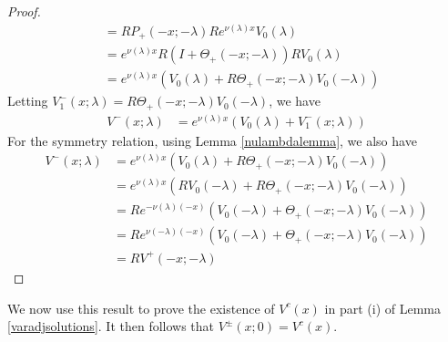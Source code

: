 \documentclass[thesis.tex]{subfiles}
\begin{document}
\begin{lemma}
\begin{proof}
\begin{align*}
&= RP_+(-x; -\lambda)R e^{\nu(\lambda)x} V_0(\lambda) \\
&= e^{\nu(\lambda)x} R(I + \Theta_+(-x; -\lambda))R V_0(\lambda) \\
&= e^{\nu(\lambda)x}( V_0(\lambda) + R\Theta_+(-x; -\lambda) V_0(-\lambda) )
\end{align*}
Letting $V_1^-(x; \lambda) = R\Theta_+(-x; -\lambda) V_0(-\lambda)$, we have
\begin{align*}
V^-(x; \lambda) &= e^{\nu(\lambda)x}( V_0(\lambda) + V_1^-(x; \lambda))
\end{align*}
For the symmetry relation, using Lemma \ref{nulambdalemma}, we also have
\begin{align*}
V^-(x; \lambda) &= e^{\nu(\lambda)x}( V_0(\lambda) + R\Theta_+(-x; -\lambda) V_0(-\lambda) ) \\
&= e^{\nu(\lambda)x}( R V_0(-\lambda) + R\Theta_+(-x; -\lambda) V_0(-\lambda) ) \\
&= R e^{-\nu(\lambda)(-x)}( V_0(-\lambda) + \Theta_+(-x; -\lambda) V_0(-\lambda) ) \\
&= R e^{\nu(-\lambda)(-x)}( V_0(-\lambda) + \Theta_+(-x; -\lambda) V_0(-\lambda) ) \\
&= R V^+(-x; -\lambda)
\end{align*}
\end{proof}
\end{lemma}

We now use this result to prove the existence of $V^c(x)$ in part (i) of Lemma \ref{varadjsolutions}. It then follows that $V^\pm(x; 0) = V^c(x)$.
\end{document}
